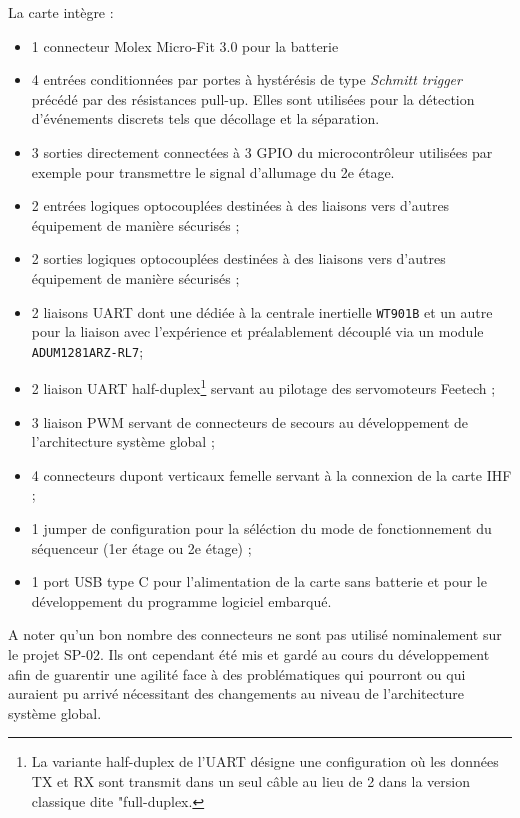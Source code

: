 
La carte intègre :
\begin{itemize}
    \item 1 connecteur Molex Micro-Fit 3.0 pour la batterie
    \item 4 entrées conditionnées par portes à hystérésis de type \textit{Schmitt trigger} précédé par des résistances
    pull-up. Elles sont utilisées pour la détection d’événements discrets tels que décollage et la séparation.  
    \item 3 sorties directement connectées à 3 \acrshort{GPIO} du microcontrôleur utilisées par exemple pour transmettre le
    signal d'allumage du 2e étage.
    \item 2 entrées logiques optocouplées destinées à des liaisons vers d'autres équipement de manière sécurisés ;
    \item 2 sorties logiques optocouplées destinées à des liaisons vers d'autres équipement de manière sécurisés ;
    \item 2 liaisons \acrshort{UART} dont une dédiée à la centrale inertielle \verb|WT901B| et un autre pour la liaison avec
    l'expérience et préalablement découplé via un module \verb|ADUM1281ARZ-RL7|;
    \item 2 liaison \acrshort{UART} half-duplex\footnote{La variante half-duplex de l'\acrshort{UART} désigne une configuration
    où les données TX et RX sont transmit dans un seul câble au lieu de 2 dans la version classique dite "full-duplex.} servant
    au pilotage des servomoteurs Feetech ;
    \item 3 liaison \acrshort{PWM} servant de connecteurs de secours au développement de l'architecture système global ;
    \item 4 connecteurs dupont verticaux femelle servant à la connexion de la carte \acrshort{IHF} ;
    \item 1 jumper de configuration pour la séléction du mode de fonctionnement du séquenceur (1er étage ou 2e étage) ;
    \item 1 port \acrshort{USB} type C pour l'alimentation de la carte sans batterie et pour le développement du programme
    logiciel embarqué.
\end{itemize}

A noter qu'un bon nombre des connecteurs ne sont pas utilisé nominalement sur le projet SP-02. Ils ont cependant été mis et
gardé au cours du développement afin de guarentir une agilité face à des problématiques qui pourront ou qui auraient pu
arrivé nécessitant des changements au niveau de l'architecture système global.  


